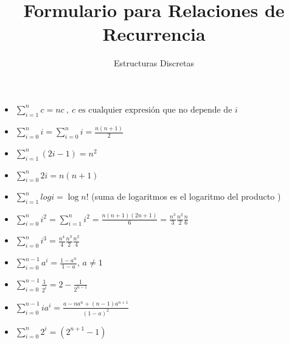 \documentclass{article}
\title{Formulario para Relaciones de Recurrencia}
\author{Estructuras Discretas}
\date{}
\theoremstyle{mytheoremstyle}
\theoremstyle{mytheoremstyle}
\theoremstyle{myproblemstyle}
\begin{document}
    \maketitle
    
    \begin{itemize}
        \item $\sum_{i=1}^{n} c = n c\ , \ c\mbox{ es cualquier expresión que no depende de }i$
        \item $\sum_{i=0}^{n}i =\sum_{i=0}^{n}i=\frac{n(n+1)}{2}$
        \item $\sum_{i=1}^{n} (2i-1) = n^2$
        \item $\sum_{i=0}^{n} 2i = n(n+1)$
        \item $\sum_{i=1}^{n} log i = \log n!$ (suma de logaritmos es el logaritmo del producto )
        \item $\sum_{i=0}^{n} i^2 = \sum_{i=1}^{n} i^2 = \frac{n(n+1)(2n+1)}{6}=\frac{n^3}{3}\frac{n^2}{2}\frac{n}{6}$
        \item $\sum_{i=0}^{n} i^3 = \frac{n^4}{4}\frac{n^3}{2}\frac{n^2}{4}$
        \item $\sum_{i=0}^{n-1} a^i = \frac{1-a^n}{1-a}$, $a\neq 1$
        \item $\sum_{i=0}^{n-1} \frac{1}{2^i}=2-\frac{1}{2^{n-1}}$
        \item $\sum_{i=0}^{n-1} ia^{i} = \frac{a-na^n+(n-1)a^{n+1}}{(1-a)^2}$
        \item $\sum_{i=0}^{n} 2^i=(2^{n+1}-1)$
    \end{itemize}
    
\end{document}
